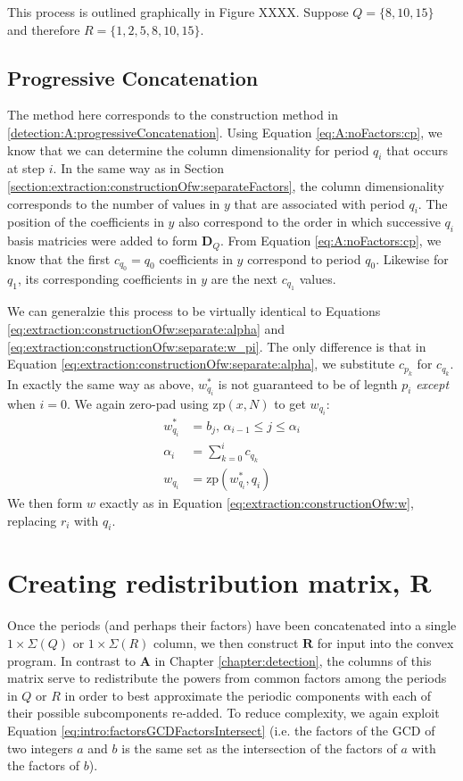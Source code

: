     This process is outlined graphically in Figure XXXX. Suppose $Q = \{8, 10, 15\}$ and therefore $R = \{1, 2, 5, 8, 10, 15\}$.

    \subsection{Progressive Concatenation}
    The method here corresponds to the construction method in \ref{detection:A:progressiveConcatenation}. Using Equation \eqref{eq:A:noFactors:cp}, we know that we can determine the column dimensionality for period $q_i$ that occurs at step $i$.
    In the same way as in Section \ref{section:extraction:constructionOfw:separateFactors}, the column dimensionality corresponds to the number of values in $y$ that are associated with period $q_i$. The position of the coefficients in $y$ also correspond to the order in which successive $q_i$ basis matricies were added to form $\bm{D}_Q$.
    From Equation \eqref{eq:A:noFactors:cp}, we know that the first $c_{q_0} = q_0$ coefficients in $y$ correspond to period $q_0$. Likewise for $q_1$, its corresponding coefficients in $y$ are the next $c_{q_1}$ values.

    We can generalzie this process to be virtually identical to Equations \eqref{eq:extraction:constructionOfw:separate:alpha} and \eqref{eq:extraction:constructionOfw:separate:w_pi}. The only difference is that in Equation \eqref{eq:extraction:constructionOfw:separate:alpha}, we substitute $c_{p_k}$ for $c_{q_k}$. In exactly the same way as above, $w_{q_i}^{*}$ is not guaranteed to be of legnth $p_i$ \emph{except} when $i = 0$. We again zero-pad using $\text{zp}(x, N)$ to get $w_{q_i}$:
    \begin{align}
        w_{q_i}^{*} &= b_j \text{, } \alpha_{i-1} \leq j \leq \alpha_{i} \\
        \alpha_{i} &= \sum_{k = 0}^{i} c_{q_k} \\
        w_{q_i} &= \text{zp}(w_{q_i}^{*}, q_i)
    \end{align}
    We then form $w$ exactly as in Equation \eqref{eq:extraction:constructionOfw:w}, replacing $r_i$ with $q_i$.


\section{Creating redistribution matrix, $\bm{R}$}
Once the periods (and perhaps their factors) have been concatenated into a single $1 \times \Sigma(Q)$ or $1 \times \Sigma(R)$ column, we then construct $\bm{R}$ for input into the convex program. In contrast to $\bm{A}$ in Chapter \ref{chapter:detection}, the columns of this matrix serve to redistribute the powers from common factors among the periods in $Q$ or $R$ in order to best approximate the periodic components with each of their possible subcomponents re-added. To reduce complexity, we again exploit Equation \eqref{eq:intro:factorsGCDFactorsIntersect} (i.e. the factors of the GCD of two integers $a$ and $b$ is the same set as the intersection of the factors of $a$ with the factors of $b$).

